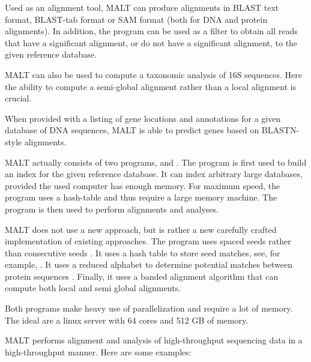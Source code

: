 \documentclass[11pt]{article}
\newcommand\MALT{{\sf MALT}\xspace}
\begin{document}
Used as an alignment tool,  \MALT can produce  alignments in BLAST  text format,
BLAST-tab format or SAM format (both for DNA and protein alignments).
In addition, the program can be used as a filter to obtain all reads that have a significant alignment, or
do not have a significant alignment, to the given reference database.

{
\MALT can also be used to compute a taxonomic analysis of 16S sequences. Here the
ability to compute a semi-global alignment rather than a local alignment is crucial.

When provided with a listing of gene locations and annotations for a given database of DNA sequences, \MALT is able to predict genes based on BLASTN-style alignments.
}

\MALT actually consists of two programs,  and
.
The  program is first used to build an index for the given reference database. It
can index arbitrary large databases, provided the used computer has enough memory.
For maximum speed, the program uses a hash-table and thus require a large memory machine.
The    program is then used to perform alignments and analyses.

\MALT does not use a new approach, but is rather a new carefully crafted implementation of existing approaches.
The program uses spaced seeds rather than consecutive seeds \cite{Burkhardt01,Ma02}.
It uses a hash table to store seed matches, see, for example, \cite{SSAHA}.
 It uses a reduced alphabet to determine potential matches between protein sequences \cite{Murphy2000,RapSearch2}.
 Finally, it uses a banded alignment algorithm \cite{ChaoPM92} that can compute both local and semi global alignments.

Both programs make heavy use of parallelization and require a lot of memory. The ideal 
are a linux server with 64 cores and 512 GB of memory.

\MALT  performs alignment and analysis of high-throughput sequencing data in a high-throughput manner. Here are some examples:
\end{document}
